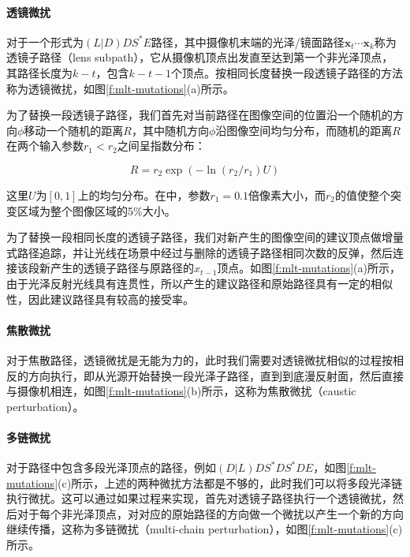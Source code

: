 \paragraph{透镜微扰}
对于一个形式为$(L|D)DS^{*}E$路径，其中摄像机末端的光泽/镜面路径$\mathbf{x}_t\cdots\mathbf{x}_k$称为透镜子路径（lens subpath），它从摄像机顶点出发直至达到第一个非光泽顶点，其路径长度为$k-t$，包含$k-t-1$个顶点。按相同长度替换一段透镜子路径的方法称为透镜微扰，如图\ref{f:mlt-mutations}(a)所示。

为了替换一段透镜子路径，我们首先对当前路径在图像空间的位置沿一个随机的方向$\phi$移动一个随机的距离$R$，其中随机方向$\phi$沿图像空间均匀分布，而随机的距离$R$在两个输入参数$r_1<r_2$之间呈指数分布：

\begin{equation}
	R=r_2\exp(-\ln(r_2/r_1)U)
\end{equation}

\noindent 这里$U$为$[0,1]$上的均匀分布。在\cite{a:MetropolisLightTransport}中，参数$r_1=0.1$倍像素大小，而$r_2$的值使整个突变区域为整个图像区域的5\%大小。

为了替换一段相同长度的透镜子路径，我们对新产生的图像空间的建议顶点做增量式路径追踪，并让光线在场景中经过与删除的透镜子路径相同次数的反弹，然后连接该段新产生的透镜子路径与原路径的$x_{t-1}$顶点。如图\ref{f:mlt-mutations}(a)所示，由于光泽反射光线具有连贯性，所以产生的建议路径和原始路径具有一定的相似性，因此建议路径具有较高的接受率。




\paragraph{焦散微扰}
对于焦散路径，透镜微扰是无能为力的，此时我们需要对透镜微扰相似的过程按相反的方向执行，即从光源开始替换一段光泽子路径，直到到底漫反射面，然后直接与摄像机相连，如图\ref{f:mlt-mutations}(b)所示，这称为焦散微扰（caustic perturbation）。



\paragraph{多链微扰}
对于路径中包含多段光泽顶点的路径，例如$(D|L)DS^{*}DS^{*}DE$，如图\ref{f:mlt-mutations}(c)所示，上述的两种微扰方法都是不够的，此时我们可以将多段光泽链执行微扰。这可以通过如果过程来实现，首先对透镜子路径执行一个透镜微扰，然后对于每个非光泽顶点，对对应的原始路径的方向做一个微扰以产生一个新的方向继续传播，这称为多链微扰（multi-chain perturbation），如图\ref{f:mlt-mutations}(c)所示。





